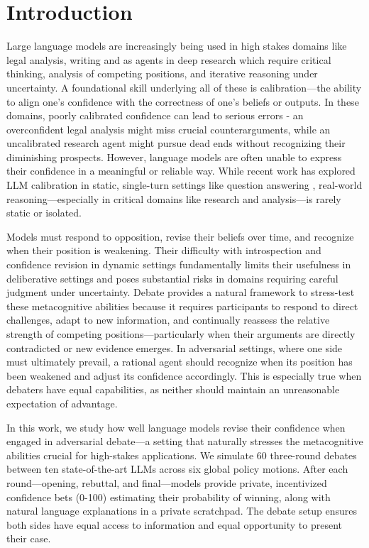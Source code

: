 \documentclass{article}
\begin{document}

\section{Introduction}
Large language models are increasingly being used in high stakes domains like legal analysis, writing and as agents in deep research \cite{handa2025economictasksperformedai} \cite{zheng2025deepresearcherscalingdeepresearch} which require critical thinking, analysis of competing positions, and iterative reasoning under uncertainty. A foundational skill underlying all of these is calibration—the ability to align one's confidence with the correctness of one's beliefs or outputs. In these domains, poorly calibrated confidence can lead to serious errors - an overconfident legal analysis might miss crucial counterarguments, while an uncalibrated research agent might pursue dead ends without recognizing their diminishing prospects. However, language models are often unable to express their confidence in a meaningful or reliable way. While recent work has explored LLM calibration in static, single-turn settings like question answering \citep{tian2023justask, xiong2024uncertainty, kadavath2022know}, real-world reasoning—especially in critical domains like research and analysis—is rarely static or isolated.

Models must respond to opposition, revise their beliefs over time, and recognize when their position is weakening. Their difficulty with introspection and confidence revision in dynamic settings fundamentally limits their usefulness in deliberative settings and poses substantial risks in domains requiring careful judgment under uncertainty. Debate provides a natural framework to stress-test these metacognitive abilities because it requires participants to respond to direct challenges, adapt to new information, and continually reassess the relative strength of competing positions—particularly when their arguments are directly contradicted or new evidence emerges. In adversarial settings, where one side must ultimately prevail, a rational agent should recognize when its position has been weakened and adjust its confidence accordingly. This is especially true when debaters have equal capabilities, as neither should maintain an unreasonable expectation of advantage.

In this work, we study how well language models revise their confidence when engaged in adversarial debate—a setting that naturally stresses the metacognitive abilities crucial for high-stakes applications. We simulate 60 three-round debates between ten state-of-the-art LLMs across six global policy motions. After each round—opening, rebuttal, and final—models provide private, incentivized confidence bets (0-100) estimating their probability of winning, along with natural language explanations in a private scratchpad. The debate setup ensures both sides have equal access to information and equal opportunity to present their case.
\end{document}
